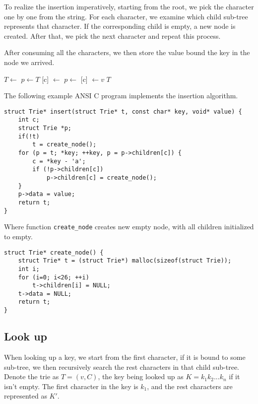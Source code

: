 \documentclass{article}
\begin{document}
To realize the insertion imperatively, starting from the root, we pick the character
one by one from the string. For each character, we examine which child sub-tree
represents that character. If the corresponding child is empty, a new node is
created. After that, we pick the next character and repeat this process.

After consuming all the characters, we then store the
value bound the key in the node we arrived.

\begin{algorithmic}[1]
    \State $T \gets $ 
  \EndIf
  \State $p \gets T$
      \State {}[c] $\gets$ 
    \EndIf
    \State $p \gets $ [c]
  \EndFor
  \State {} $\gets v$
  \State \Return $T$
\EndFunction
\end{algorithmic}

The following example ANSI C program implements the insertion algorithm.

\lstset{language=C}
\begin{lstlisting}
struct Trie* insert(struct Trie* t, const char* key, void* value) {
    int c;
    struct Trie *p;
    if(!t)
        t = create_node();
    for (p = t; *key; ++key, p = p->children[c]) {
        c = *key - 'a';
        if (!p->children[c])
            p->children[c] = create_node();
    }
    p->data = value;
    return t;
}
\end{lstlisting}

Where function \texttt{create\_node} creates new empty node, with all
children initialized to empty.

\begin{lstlisting}
struct Trie* create_node() {
    struct Trie* t = (struct Trie*) malloc(sizeof(struct Trie));
    int i;
    for (i=0; i<26; ++i)
        t->children[i] = NULL;
    t->data = NULL;
    return t;
}
\end{lstlisting}

\subsection{Look up}

When looking up a key, we start from the first character,
if it is bound to some sub-tree, we then
recursively search the rest characters in that child sub-tree.
Denote the trie as $T = (v, C)$, the key being looked up as
$K = k_1k_2...k_n$ if it isn't empty. The first character in
the key is $k_1$, and the rest characters are represented as $K'$.
\end{document}
